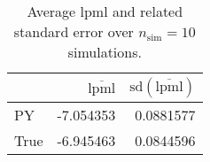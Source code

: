 \begin{table}[H]

\caption{Average lpml and related standard error over $n_{\text{sim}} = 10$ simulations.}
\centering
\begin{tabular}[t]{lrr}
\toprule
  & $\overbar{\text{lpml}}$ & $\text{sd}(\overbar{\text{lpml}})$\\
\midrule
PY & -7.054353 & 0.0881577\\
True & -6.945463 & 0.0844596\\
\bottomrule
\end{tabular}
\end{table}